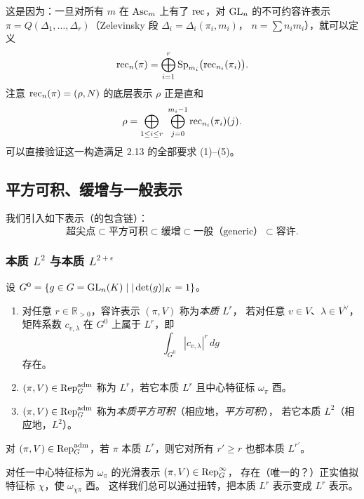 这是因为：一旦对所有 $m$ 在 $\mathrm{Asc}_m$ 上有了 $\mathrm{rec}$，对 $\mathrm{GL}_n$ 的不可约容许表示
$\pi=Q(\Delta_1,\dots,\Delta_r)$（Zelevinsky 段 $\Delta_i=\Delta_i(\pi_i,m_i)$，
$n=\sum n_im_i$），就可以定义
\[
\mathrm{rec}_n(\pi)=\bigoplus_{i=1}^{r}\mathrm{Sp}_{m_i}\bigl(\mathrm{rec}_{n_i}(\pi_i)\bigr).
\]
注意 $\mathrm{rec}_n(\pi)=(\rho,N)$ 的底层表示 $\rho$ 正是直和
\[
\rho=\bigoplus_{1\le i\le r}\ \bigoplus_{j=0}^{m_i-1}\rec_{n_i}(\pi_i)(j).
\]
可以直接验证这一构造满足 2.13 的全部要求 (1)--(5)。

\subsection{平方可积、缓增与一般表示}

我们引入如下表示（的包含链）：
\[
\text{超尖点}\subset\text{平方可积}\subset\text{缓增}\subset\text{一般（generic）}
\subset\text{容许}.
\]

\subsubsection{本质 $L^2$ 与本质 $L^{2+\epsilon}$}

\begin{definition}
设 $G^{0}=\{g\in G=\mathrm{GL}_n(K)\mid |\det(g)|_K=1\}$。
\begin{enumerate}[label=(\arabic*),leftmargin=2.2em]
\item 对任意 $r\in\mathbb{R}_{>0}$，容许表示 $(\pi,V)$ 称为\emph{本质 $L^r$}，
      若对任意 $v\in V$、$\lambda\in V^{\vee}$，矩阵系数 $c_{v,\lambda}$ 在 $G^{0}$ 上属于 $L^r$，即
\[
\int_{G^{0}}|c_{v,\lambda}|^{r}\,dg
\]
存在。
\item $(\pi,V)\in\mathrm{Rep}^{\mathrm{adm}}_G$ 称为 $L^r$，若它本质 $L^r$ 且中心特征标 $\omega_{\pi}$ 酉。
\item $(\pi,V)\in\mathrm{Rep}^{\mathrm{adm}}_G$ 称为\emph{本质平方可积}（相应地，\emph{平方可积}），
      若它本质 $L^2$（相应地，$L^2$）。
\end{enumerate}
\end{definition}

\begin{remark}
对 $(\pi,V)\in\mathrm{Rep}^{\mathrm{adm}}_G$，若 $\pi$ 本质 $L^r$，则它对所有 $r'\ge r$ 也都本质 $L^{r'}$。
\end{remark}

\begin{remark}[Casselman 1980]
对任一中心特征标为 $\omega_{\pi}$ 的光滑表示 $(\pi,V)\in\mathrm{Rep}^{\infty}_G$，
存在（唯一的？）正实值拟特征标 $\chi$，使 $\omega_{\chi\pi}$ 酉。
这样我们总可以通过扭转，把本质 $L^r$ 表示变成 $L^r$ 表示。
\end{remark}

